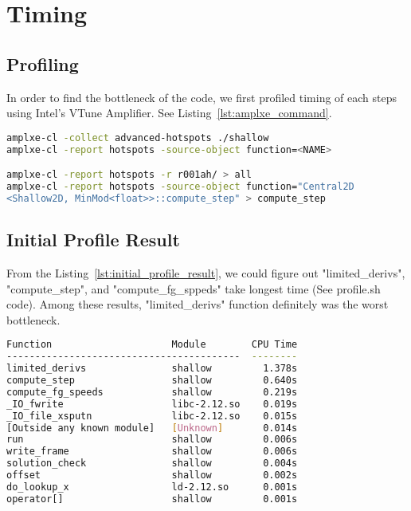 \section{Timing}
\subsection{Profiling}
In order to find the bottleneck of the code, we first profiled
 timing of each steps using Intel’s VTune Amplifier. See Listing~\ref{lst:amplxe_command}.
 
\begin{lstlisting}[caption={VTune Amplifier Command},label={lst:amplxe_command},frame=single,language=bash]
amplxe-cl -collect advanced-hotspots ./shallow
amplxe-cl -report hotspots -source-object function=<NAME>

amplxe-cl -report hotspots -r r001ah/ > all
amplxe-cl -report hotspots -source-object function="Central2D
<Shallow2D, MinMod<float>>::compute_step" > compute_step
\end{lstlisting}

\subsection{Initial Profile Result}

From the Listing~\ref{lst:initial_profile_result}, we could figure out "limited\_derivs", "compute\_step", and "compute\_fg\_sppeds" take longest time (See profile.sh code). Among these results, "limited\_derivs" function definitely was the worst bottleneck. 

\begin{lstlisting}[caption={Initial Profile Result},label={lst:initial_profile_result},frame=single,language=bash]
Function                     Module        CPU Time
-----------------------------------------  --------
limited_derivs               shallow         1.378s
compute_step                 shallow         0.640s
compute_fg_speeds            shallow         0.219s
_IO_fwrite                   libc-2.12.so    0.019s
_IO_file_xsputn              libc-2.12.so    0.015s
[Outside any known module]   [Unknown]       0.014s
run                          shallow         0.006s
write_frame                  shallow         0.006s
solution_check               shallow         0.004s
offset                       shallow         0.002s
do_lookup_x                  ld-2.12.so      0.001s
operator[]                   shallow         0.001s
\end{lstlisting}

